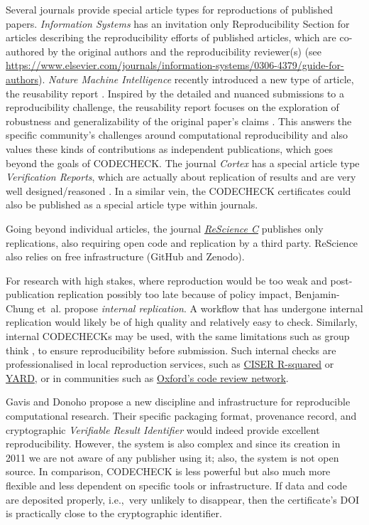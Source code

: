 \documentclass[12pt]{article}
\begin{document}
Several journals provide special article types for reproductions of
published papers.  \emph{Information Systems} has an invitation only
Reproducibility Section for articles describing the reproducibility 
efforts of published articles, which are co-authored by the original
authors and the reproducibility reviewer(s) (see
\url{https://www.elsevier.com/journals/information-systems/0306-4379/guide-for-authors}).
\emph{Nature Machine Intelligence} recently introduced a new type of
article, the reusability report \cite{noauthor_research_2020}.
Inspired by the detailed and nuanced submissions to a reproducibility
challenge, the reusability report focuses on the exploration of
robustness and generalizability of the original paper's claims
\cite{noauthor_research_2020}. This answers the specific community's
challenges around computational reproducibility and also values these
kinds of contributions as independent publications, which goes beyond
the goals of CODECHECK.  The journal \emph{Cortex} has a special
article type \emph{Verification Reports}, which are actually about
replication of results and are very well designed/reasoned
\cite{chambers_verification_2020}.  In a similar vein, the CODECHECK
certificates could also be published as a special article type within
journals.

Going beyond individual articles, the journal \href{https://rescience.github.io}{\emph{ReScience C}}
publishes only replications, also
requiring open code and replication by a third party. ReScience also
relies on free infrastructure (GitHub and Zenodo).

For research with high stakes, where reproduction would be too weak and
post-publication replication possibly too late because of policy impact,
Benjamin-Chung et~al. \cite{benjamin-chung_internal_2020} propose
\emph{internal replication}.
A workflow that has undergone internal
replication would likely be of high quality and relatively easy to check.
Similarly, internal CODECHECKs may be used, with the same limitations such
as group think \cite{benjamin-chung_internal_2020},
to ensure reproducibility before submission.
Such internal checks are professionalised in local reproduction services,
such as \href{https://ciser.cornell.edu/research/results-reproduction-r-squared-service/}{CISER R-squared} or \href{https://isps.yale.edu/research/data/approach}{YARD},
or in communities such as \href{https://github.com/OxfordCodeReviewNet/forum}{Oxford's code review network}.

Gavis and Donoho \cite{gavish_universal_2011} propose a new discipline
and infrastructure for reproducible computational research. Their
specific packaging format, provenance record, and cryptographic
\emph{Verifiable Result Identifier} would indeed provide excellent
reproducibility. However, the system is also complex and since its
creation in 2011 we are not aware of any publisher using it; also, the
system is not open source.  In comparison, CODECHECK is less powerful
but also much more flexible and less dependent on specific tools or
infrastructure. If data and code are deposited properly, i.e.,~very
unlikely to disappear, then the certificate's DOI is practically close
to the cryptographic identifier.
\end{document}
